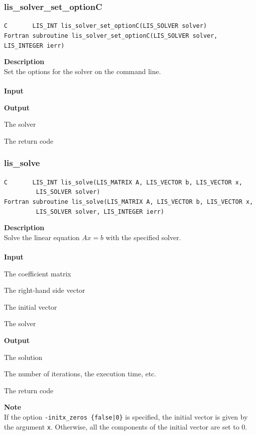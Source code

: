 \documentclass[a4paper]{article}
\newcommand{\namelistlabel}[1]{\mbox{#1}\hfill}
\newenvironment{namelist}[1]{%
\begin{list}{}
  {\let\makelabel\namelistlabel
  \settowidth{\labelwidth}{#1}
  \setlength{\leftmargin}{1.1\labelwidth}}
  }{%
\end{list}}
\begin{document}
\subsubsection{lis\_solver\_set\_optionC}
\begin{screen}
\verb|C       LIS_INT lis_solver_set_optionC(LIS_SOLVER solver)|\\
\verb|Fortran subroutine lis_solver_set_optionC(LIS_SOLVER solver, LIS_INTEGER ierr)|
\end{screen}
{\bf Description}\\
\indent
Set the options for the solver on the command line.
\\ \\
\noindent
{\bf Input}
\begin{namelist}{XXXXXXXXXXXXXXXXXXXX}
\item[None]
\end{namelist}
{\bf Output}
\begin{namelist}{XXXXXXXXXXXXXXXXXXXX}
\item[\tt solver] The solver
\item[\tt ierr] The return code
\end{namelist}

\subsubsection{lis\_solve}
\begin{screen}
\verb|C       LIS_INT lis_solve(LIS_MATRIX A, LIS_VECTOR b, LIS_VECTOR x,|\\
\verb|         LIS_SOLVER solver)|\\
\verb|Fortran subroutine lis_solve(LIS_MATRIX A, LIS_VECTOR b, LIS_VECTOR x,|\\
\verb|         LIS_SOLVER solver, LIS_INTEGER ierr)|
\end{screen}
{\bf Description}\\
\indent
Solve the linear equation $Ax = b$ with the specified solver.
\\ \\
\noindent
{\bf Input}
\begin{namelist}{XXXXXXXXXXXXXXXXXXXX}
\item[\tt A] The coefficient matrix
\item[\tt b] The right-hand side vector
\item[\tt x] The initial vector
\item[\tt solver] The solver
\end{namelist}
{\bf Output}
\begin{namelist}{XXXXXXXXXXXXXXXXXXXX}
\item[\tt x] The solution
\item[\tt solver] The number of iterations, the execution time, etc.
\item[\tt ierr] The return code
\end{namelist}
{\bf Note}\\
\indent
If the option {\tt -initx\_zeros \{false|0\}} is specified, the initial
vector is given by the argument {\tt x}.
Otherwise, all the components of the initial vector are set to $0$.
\end{document}
